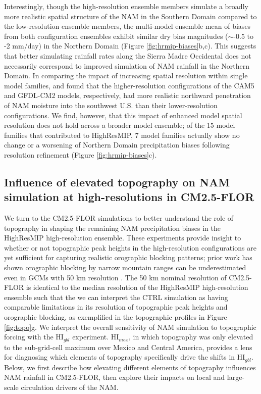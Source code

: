\documentclass[draft]{agujournal2019}
\begin{document}
Interestingly, though the high-resolution ensemble members simulate a broadly more realistic spatial structure of the NAM in the Southern Domain compared to the low-resolution ensemble members, the multi-model ensemble mean of biases from both configuration ensembles exhibit similar dry bias magnitudes ($\sim$-0.5 to -2 mm/day) in the Northern Domain (Figure \ref{fig:hrmip-biases}b,c). This suggests that better simulating rainfall rates along the Sierra Madre Occidental does not necessarily correspond to improved simulation of NAM rainfall in the Northern Domain. In comparing the impact of increasing spatial resolution within single model families,  and  found that the higher-resolution configurations of the CAM5 and GFDL-CM2 models, respectively, had more realistic northward penetration of NAM moisture into the southwest U.S. than their lower-resolution configurations. We find, however, that this impact of enhanced model spatial resolution does not hold across a broader model ensemble; of the 15 model families that contributed to HighResMIP, 7 model families actually show no change or a worsening of Northern Domain precipitation biases following resolution refinement (Figure \ref{fig:hrmip-biases}c).


\subsection{Influence of elevated topography on NAM simulation at high-resolutions in CM2.5-FLOR}
We turn to the CM2.5-FLOR simulations to better understand the role of topography in shaping the remaining NAM precipitation biases in the HighResMIP high-resolution ensemble. These experiments provide insight to whether or not topographic peak heights in the high-resolution configurations are yet sufficient for capturing realistic orographic blocking patterns; prior work has shown orographic blocking by narrow mountain ranges can be underestimated even in GCMs with 50 km resolution \cite{baldwin21a}. The 50 km nominal resolution of CM2.5-FLOR is identical to the median resolution of the HighResMIP high-resolution ensemble such that the we can interpret the CTRL simulation as having comparable limitations in its resolution of topographic peak heights and orographic blocking, as exemplified in the topographic profiles in Figure \ref{fig:topo}g. We interpret the overall sensitivity of NAM simulation to topographic forcing with the HI$_{gbl}$ experiment. HI$_{mex}$, in which topography was only elevated to the sub-grid-cell maximum over Mexico and Central America, provides a lens for diagnosing which elements of topography specifically drive the shifts in HI$_{gbl}$. Below, we first describe how elevating different elements of topography influences NAM rainfall in CM2.5-FLOR, then explore their impacts on local and large-scale circulation drivers of the NAM. %
\end{document}
